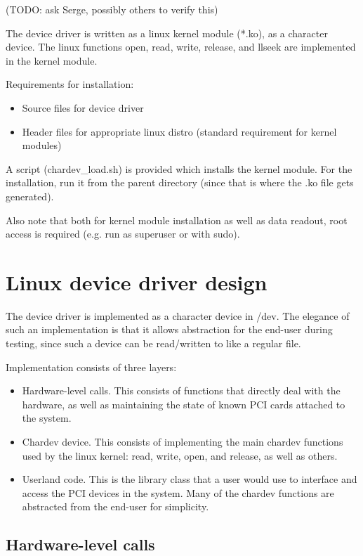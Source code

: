 \documentclass[12pt]{article}
\begin{document}
(TODO: ask Serge, possibly others to verify this)

The device driver is written as a linux kernel module (*.ko), as a character device.  The linux functions open, read, write, release, and llseek are implemented in the kernel module.

Requirements for installation:

\begin{itemize}
\item Source files for device driver
\item Header files for appropriate linux distro (standard requirement for kernel modules)
\end{itemize}

A script (chardev\_load.sh) is provided which installs the kernel module.  For the installation, run it from the parent directory (since that is where the .ko file gets generated).

Also note that both for kernel module installation as well as data readout, root access is required (e.g. run as superuser or with sudo).

\section{Linux device driver design}

The device driver is implemented as a character device in /dev.  The elegance of such an implementation is that it allows abstraction for the end-user during testing, since such a device can be read/written to like a regular file.

Implementation consists of three layers:

\begin{itemize}
\item Hardware-level calls.  This consists of functions that directly deal with the hardware, as well as maintaining the state of known PCI cards attached to the system.
\item Chardev device.  This consists of implementing the main chardev functions used by the linux kernel: read, write, open, and release, as well as others.
\item Userland code.  This is the library class that a user would use to interface and access the PCI devices in the system.  Many of the chardev functions are abstracted from the end-user for simplicity.
\end{itemize}

\subsection{Hardware-level calls}
\end{document}

